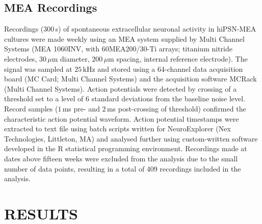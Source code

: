 \documentclass[12pt, titlepage]{article}
\begin{document}
\subsection*{MEA Recordings}
Recordings ($300$\,s) of spontaneous extracellular neuronal activity in hiPSN-MEA cultures were made weekly using an MEA system supplied by Multi Channel Systems (MEA 1060INV, with 60MEA200/30-Ti arrays; titanium nitride electrodes, $30\,\mu$m diameter, $200\,\mu$m spacing, internal reference electrode). The signal was sampled at $25\,$kHz and stored using a 64-channel data acquisition board (MC Card; Multi Channel Systems) and the acquisition software MCRack (Multi Channel Systems). Action potentials were detected by crossing of a threshold set to a level of 6 standard deviations from the baseline noise level. Record samples ($1\,$ms pre- and $2\,$ms post-crossing of threshold) confirmed the characteristic action potential waveform. Action potential timestamps were extracted to text file using batch scripts written for NeuroExplorer (Nex Technologies, Littleton, MA) and analysed further using custom-written software developed in the R statistical programming environment. Recordings made at dates above fifteen weeks were excluded from the analysis due to the small number of data points, resulting in a total of 409 recordings included in the analysis.
	\section*{RESULTS}
\end{document}
